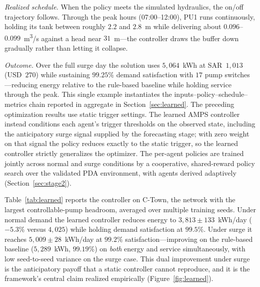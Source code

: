 \documentclass[11pt,a4paper]{article}
\begin{document}
\emph{Realized schedule.} When the policy meets the simulated hydraulics, the
on/off trajectory follows. Through the peak hours (07:00--12:00), PU1 runs
continuously, holding its tank between roughly $2.2$ and $2.8$~m while delivering
about $0.096$--$0.099$~m\textsuperscript{3}/s against a head near $31$~m---the
controller draws the buffer down gradually rather than letting it collapse.

\emph{Outcome.} Over the full surge day the solution uses
$5{,}064$~kWh at SAR~$1{,}013$ (USD~$270$) while sustaining
$99.25\%$ demand satisfaction with $17$ pump switches---reducing energy relative
to the rule-based baseline while holding service through the peak. This single
example instantiates the inputs--policy--schedule--metrics chain reported in
aggregate in Section~\ref{sec:learned}.
\label{sec:learned}
The preceding optimization results use static trigger settings. The learned AMPS
controller instead conditions each agent's trigger thresholds on the observed
state, including the anticipatory surge signal supplied by the forecasting stage;
with zero weight on that signal the policy reduces exactly to the static trigger,
so the learned controller strictly generalizes the optimizer. The per-agent
policies are trained jointly across normal and surge conditions by a cooperative,
shared-reward policy search over the validated PDA environment, with agents
derived adaptively (Section~\ref{sec:stage2}).

Table~\ref{tab:learned} reports the controller on C-Town, the network with the
largest controllable-pump headroom, averaged over multiple training seeds. Under
normal demand the learned controller reduces energy to
$3{,}813\pm133$~kWh/day ($-5.3\%$ versus $4{,}025$) while holding demand
satisfaction at $99.5\%$. Under surge it reaches $5{,}009\pm28$~kWh/day at
$99.2\%$ satisfaction---improving on the rule-based baseline ($5{,}289$~kWh,
$99.19\%$) on \emph{both} energy and service simultaneously, with low
seed-to-seed variance on the surge case. This dual improvement under surge is the
anticipatory payoff that a static controller cannot reproduce, and it is the
framework's central claim realized empirically (Figure~\ref{fig:learned}).
\end{document}
